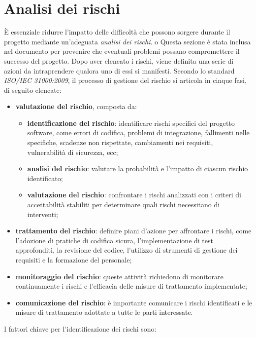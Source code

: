 \section{Analisi dei rischi} 
È essenziale ridurre l'impatto delle difficoltà che possono sorgere durante il progetto mediante un'adeguata \textit{analisi dei rischi}. o
Questa sezione è stata inclusa nel documento per prevenire che eventuali problemi possano compromettere il successo del progetto. Dopo aver elencato i rischi, viene definita una serie di azioni da intraprendere qualora uno di essi si manifesti. Secondo lo standard \textit{ISO/IEC 31000:2009}, il processo di gestione del rischio si articola in cinque fasi, di seguito elencate:
\begin{itemize}
	\item \textbf{valutazione del rischio}, composta da:
	      \begin{itemize}
		      \item \textbf{identificazione del rischio}: identificare rischi specifici del progetto software, come errori di codifica, problemi di integrazione, fallimenti nelle specifiche, scadenze non rispettate, cambiamenti nei requisiti, vulnerabilità di sicurezza, ecc;
		      \item \textbf{analisi del rischio}: valutare la probabilità e l'impatto di ciascun rischio identificato;
		      \item \textbf{valutazione del rischio}: confrontare i rischi analizzati con i criteri di accettabilità stabiliti per determinare quali rischi necessitano di interventi;
	      \end{itemize}
	\item \textbf{trattamento del rischio}: definire piani d'azione per affrontare i rischi, come l'adozione di pratiche di codifica sicura, l'implementazione di test approfonditi, la revisione del codice, l'utilizzo di strumenti di gestione dei requisiti e la formazione del personale;
	\item \textbf{monitoraggio del rischio}: queste attività richiedono di monitorare continuamente i rischi e l'efficacia delle misure di trattamento implementate;
	\item \textbf{comunicazione del rischio}: è importante comunicare i rischi identificati e le misure di trattamento adottate a tutte le parti interessate.
\end{itemize}
I fattori chiave per l'identificazione dei rischi sono:
